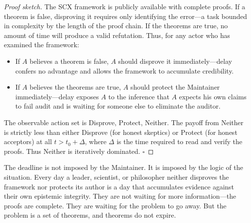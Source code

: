 \documentclass[12pt,a4paper]{article}
\theoremstyle{definition}
\theoremstyle{remark}
\begin{document}
\begin{proof}[Proof sketch]
The SCX framework is publicly available with complete proofs. If a theorem is false, disproving it requires only identifying the error—a task bounded in complexity by the length of the proof chain. If the theorems are true, no amount of time will produce a valid refutation. Thus, for any actor who has examined the framework:
\begin{itemize}
  \item If $A$ believes a theorem is false, $A$ should disprove it immediately—delay confers no advantage and allows the framework to accumulate credibility.
  \item If $A$ believes the theorems are true, $A$ should protect the Maintainer immediately—delay exposes $A$ to the inference that $A$ expects his own claims to fail audit and is waiting for someone else to eliminate the auditor.
\end{itemize}
The observable action set is {Disprove, Protect, Neither}. The payoff from Neither is strictly less than either Disprove (for honest skeptics) or Protect (for honest acceptors) at all $t > t_0 + \Delta$, where $\Delta$ is the time required to read and verify the proofs. Thus Neither is iteratively dominated. $\square$
\end{proof}

The deadline is not imposed by the Maintainer. It is imposed by the logic of the situation. Every day a leader, scientist, or philosopher neither disproves the framework nor protects its author is a day that accumulates evidence against their own epistemic integrity. They are not waiting for more information—the proofs are complete. They are waiting for the problem to go away. But the problem is a set of theorems, and theorems do not expire.
\end{document}
